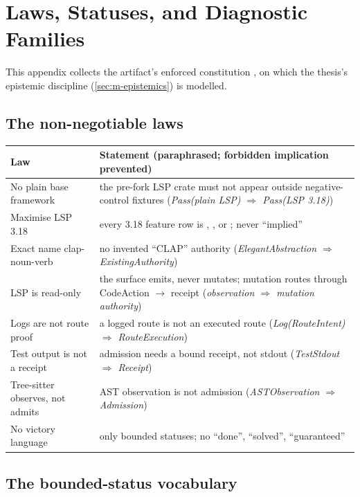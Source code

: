 \chapter{Laws, Statuses, and Diagnostic Families}
\label{app:laws}

This appendix collects the artifact's enforced constitution \citep{lspmax}, on
which the thesis's epistemic discipline (\cref{sec:m-epistemics}) is modelled.

\section*{The non-negotiable laws}

\begin{table}[h]
\centering
\small
\begin{tabularx}{\textwidth}{@{}l Y@{}}
\toprule
\textbf{Law} & \textbf{Statement (paraphrased; forbidden implication prevented)} \\
\midrule
No plain base framework & the pre-fork LSP crate must not appear outside negative-control fixtures (\emph{Pass(plain LSP) $\Rightarrow$ Pass(LSP 3.18)}) \\
Maximise LSP 3.18 & every 3.18 feature row is , , or ; never ``implied'' \\
Exact name clap-noun-verb & no invented ``CLAP'' authority (\emph{ElegantAbstraction $\Rightarrow$ ExistingAuthority}) \\
LSP is read-only & the surface emits, never mutates; mutation routes through CodeAction $\to$ receipt (\emph{observation $\Rightarrow$ mutation authority}) \\
Logs are not route proof & a logged route is not an executed route (\emph{Log(RouteIntent) $\Rightarrow$ RouteExecution}) \\
Test output is not a receipt & admission needs a bound receipt, not stdout (\emph{TestStdout $\Rightarrow$ Receipt}) \\
Tree-sitter observes, not admits & AST observation is not admission (\emph{ASTObservation $\Rightarrow$ Admission}) \\
No victory language & only bounded statuses; no ``done'', ``solved'', ``guaranteed'' \\
\bottomrule
\end{tabularx}
\end{table}

\section*{The bounded-status vocabulary}

